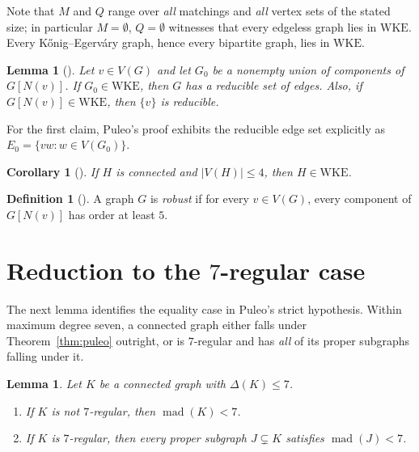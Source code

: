 \documentclass[11pt,a4paper]{amsart}
\theoremstyle{plain}
\newtheorem{lemma}[theorem]{Lemma}
\newtheorem{corollary}[theorem]{Corollary}
\theoremstyle{definition}
\newtheorem{definition}[theorem]{Definition}
\newcommand{\mad}{\operatorname{mad}}
\newcommand{\WKE}{\mathrm{WKE}}
\newcommand{\N}{N}
\begin{document}
Note that $M$ and $Q$ range over \emph{all} matchings and \emph{all} vertex
sets of the stated size; in particular $M=\emptyset$, $Q=\emptyset$ witnesses
that every edgeless graph lies in $\WKE$. Every K\H{o}nig--Egerv\'ary graph,
hence every bipartite graph, lies in $\WKE$.

\begin{lemma}[{\cite[Lemma 4.4]{Puleo2015}}]\label{lem:puleo44}
Let $v\in V(G)$ and let $G_0$ be a nonempty union of components of
$G[\N(v)]$. If $G_0\in\WKE$, then $G$ has a reducible set of edges. Also, if
$G[\N(v)]\in\WKE$, then $\{v\}$ is reducible.
\end{lemma}

For the first claim, Puleo's proof exhibits the reducible edge set explicitly
as $E_0=\{vw : w\in V(G_0)\}$.

\begin{corollary}[{\cite[Corollary 4.9]{Puleo2015}}]\label{cor:puleo49}
If $H$ is connected and $|V(H)|\le 4$, then $H\in\WKE$.
\end{corollary}

\begin{definition}[{\cite[Definition 2.3]{Puleo2015}}]\label{def:robust}
A graph $G$ is \emph{robust} if for every $v\in V(G)$, every component of
$G[\N(v)]$ has order at least $5$.
\end{definition}

\section{Reduction to the \texorpdfstring{$7$}{7}-regular case}\label{sec:regular}

The next lemma identifies the equality case in Puleo's strict hypothesis.
Within maximum degree seven, a connected graph either falls under
Theorem~\ref{thm:puleo} outright, or is $7$-regular and has \emph{all} of its
proper subgraphs falling under it.

\begin{lemma}\label{lem:madhinge}
Let $K$ be a connected graph with $\Delta(K)\le 7$.
\begin{enumerate}
  \item[(a)] If $K$ is not $7$-regular, then $\mad(K)<7$.
  \item[(b)] If $K$ is $7$-regular, then every proper subgraph $J\subsetneq K$
    satisfies $\mad(J)<7$.
\end{enumerate}
\end{lemma}
\end{document}

